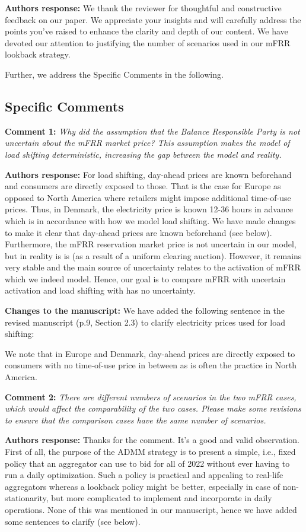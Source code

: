 \documentclass[10pt]{article}
\newcommand{\nt}[1]{\textcolor{newtextcolor}{#1}}
\newcommand{\auth}{\textbf{Authors response: }}
\newcommand{\changes}{\textbf{Changes to the manuscript: }}
\begin{document}
\auth We thank the reviewer for thoughtful and constructive feedback on our paper. We appreciate your insights and will carefully address the points you've raised to enhance the clarity and depth of our content. We have devoted our attention to justifying the number of scenarios used in our mFRR lookback strategy.

Further, we address the Specific Comments in the following.

\subsection{Specific Comments}
\textbf{Comment 1:} \textit{Why did the assumption that the Balance Responsible Party is not uncertain about the mFRR market price? This assumption makes the model of load shifting deterministic, increasing the gap between the model and reality.}

\auth For load shifting, day-ahead prices are known beforehand and consumers are directly exposed to those. That is the case for Europe as opposed to North America where retailers might impose additional time-of-use prices. Thus, in Denmark, the electricity price is known 12-36 hours in advance which is in accordance with how we model load shifting. We have made changes to make it clear that day-ahead prices are known beforehand (see below). Furthermore, the mFRR reservation market price is not uncertain in our model, but in reality is is (as a result of a uniform clearing auction). However, it remains very stable and the main source of uncertainty relates to the activation of mFRR which we indeed model. Hence, our goal is to compare mFRR with uncertain activation and load shifting with has no uncertainty.

\changes We have added the following sentence in the revised manuscript (p.9, Section 2.3) to clarify electricity prices used for load shifting:

\nt{We note that in Europe and Denmark, day-ahead prices are directly exposed to consumers with no time-of-use price in between as is often the practice in North America.}

\textbf{Comment 2:} \textit{There are different numbers of scenarios in the two mFRR cases, which would affect the comparability of the two cases. Please make some revisions to ensure that the comparison cases have the same number of scenarios.}

\auth Thanks for the comment. It's a good and valid observation. First of all, the purpose of the ADMM strategy is to present a simple, i.e., fixed policy that an aggregator can use to bid for all of 2022 without ever having to run a daily optimization. Such a policy is practical and appealing to real-life aggregators whereas a lookback policy might be better, especially in case of non-stationarity, but more complicated to implement and incorporate in daily operations. None of this was mentioned in our manuscript, hence we have added some sentences to clarify (see below).
\end{document}
